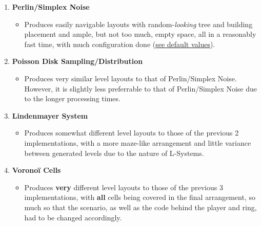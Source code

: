 \begin{enumerate}
    \item \textbf{Perlin/Simplex Noise}
    \begin{itemize}
        \item Produces easily navigable layouts with random-\textit{looking} tree and building placement and ample, but not too much, empty space, all in a reasonably fast time, with much configuration done (\hyperref[noisedefaults]{see default values}).
    \end{itemize}
    \item \textbf{Poisson Disk Sampling/Distribution}
    \begin{itemize}
        \item Produces very similar level layouts to that of Perlin/Simplex Noise. However, it is slightly less preferrable to that of Perlin/Simplex Noise due to the longer processing times.
    \end{itemize}
    \item \textbf{Lindenmayer System}
    \begin{itemize}
        \item Produces somewhat different level layouts to those of the previous 2 implementations, with a more maze-like arrangement and little variance between generated levels due to the nature of L-Systems.
    \end{itemize}
    \item \textbf{Voronoï Cells}
    \begin{itemize}
        \item Produces \textbf{very} different level layouts to those of the previous 3 implementations, with \textbf{all} cells being covered in the final arrangement, so much so that the scenario, as well as the code behind the player and ring, had to be changed accordingly.
    \end{itemize}
\end{enumerate}
